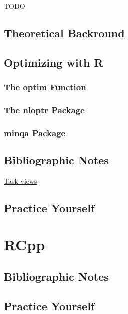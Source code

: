 \documentclass[]{book}
\theoremstyle{definition}
\theoremstyle{definition}
\theoremstyle{definition}
\theoremstyle{remark}
\begin{document}
TODO

\section{Theoretical Backround}\label{theoretical-backround}

\section{Optimizing with R}\label{optimizing-with-r}

\subsection{The optim Function}\label{the-optim-function}

\subsection{The nloptr Package}\label{the-nloptr-package}

\subsection{minqa Package}\label{minqa-package}

\section{Bibliographic Notes}\label{bibliographic-notes-15}

\href{https://cran.r-project.org/web/views/Optimization.html}{Task
views}

\section{Practice Yourself}\label{practice-yourself-14}

\chapter{RCpp}\label{rcpp}

\section{Bibliographic Notes}\label{bibliographic-notes-16}

\section{Practice Yourself}\label{practice-yourself-15}
\end{document}
